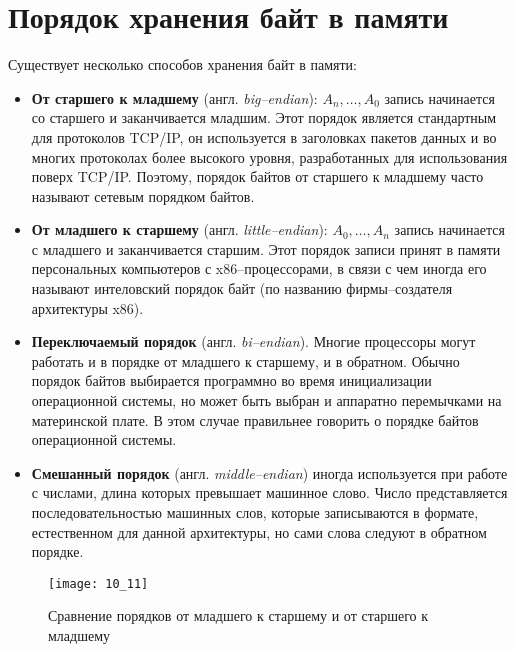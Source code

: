 \section{Порядок хранения байт в памяти}
Существует несколько способов хранения байт в памяти:
\begin{itemize}
  \item \textbf{От старшего к младшему} (англ. \emph{big--endian}): $A_n,\dots,A_0$ запись начинается со старшего и заканчивается младшим. Этот порядок является стандартным для протоколов TCP/IP, он используется в заголовках пакетов данных и во многих протоколах более высокого уровня, разработанных для использования поверх TCP/IP. Поэтому, порядок байтов от старшего к младшему часто называют сетевым порядком байтов.
  \item \textbf{От младшего к старшему} (англ. \emph{little--endian}): $A_0,\dots,A_n$ запись начинается с младшего и заканчивается старшим. Этот порядок записи принят в памяти персональных компьютеров с x86--процессорами, в связи с чем иногда его называют интеловский порядок байт (по названию фирмы--создателя архитектуры x86).
  \item \textbf{Переключаемый порядок} (англ. \emph{bi--endian}). Многие процессоры могут работать и в порядке от младшего к старшему, и в обратном. Обычно порядок байтов выбирается программно во время инициализации операционной системы, но может быть выбран и аппаратно перемычками на материнской плате. В этом случае правильнее говорить о порядке байтов операционной системы.
  \item \textbf{Смешанный порядок} (англ. \emph{middle--endian}) иногда используется при работе с числами, длина которых превышает машинное слово. Число представляется последовательностью машинных слов, которые записываются в формате, естественном для данной архитектуры, но сами слова следуют в обратном порядке.
\end{itemize}
\begin{figure}[h]
\texttt{[image: 10\_11]}
\caption{Сравнение порядков от младшего к старшему и от старшего к младшему}
\end{figure}